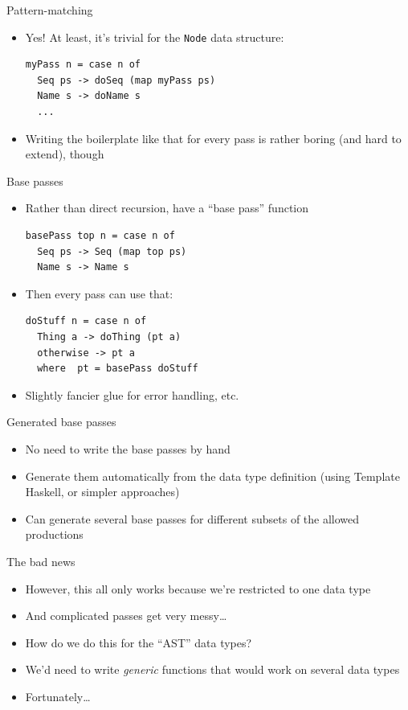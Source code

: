 \documentclass[adam,pdf,slideColor]{prosper}
\begin{document}
\begin{slide}{Pattern-matching}
\begin{itemize}
\item Yes! At least, it's trivial for the \verb|Node| data structure:
\begin{verbatim}
myPass n = case n of
  Seq ps -> doSeq (map myPass ps)
  Name s -> doName s
  ...
\end{verbatim}
\item Writing the boilerplate like that for every pass is rather
  boring (and hard to extend), though
\end{itemize}
\end{slide}

\begin{slide}{Base passes}
\begin{itemize}
\item Rather than direct recursion, have a
  ``base pass'' function
\begin{verbatim}
basePass top n = case n of
  Seq ps -> Seq (map top ps)
  Name s -> Name s
\end{verbatim}
\item Then every pass can use that:
\begin{verbatim}
doStuff n = case n of
  Thing a -> doThing (pt a)
  otherwise -> pt a
  where  pt = basePass doStuff
\end{verbatim}
\item Slightly fancier glue for error handling, etc.
\end{itemize}
\end{slide}

\begin{slide}{Generated base passes}
\begin{itemize}
\item No need to write the base passes by hand
\item Generate them automatically from the data type definition (using
  Template Haskell, or simpler approaches)
\item Can generate several base passes for different subsets of the
  allowed productions
\end{itemize}
\end{slide}

\begin{slide}{The bad news}
\begin{itemize}
\item However, this all only works because we're restricted to one
  data type
\item And complicated passes get very messy\ldots
\item How do we do this for the ``AST'' data types?
\item We'd need to write \emph{generic} functions that would work on
  several data types
\item Fortunately\ldots
\end{itemize}
\end{slide}
\end{document}
